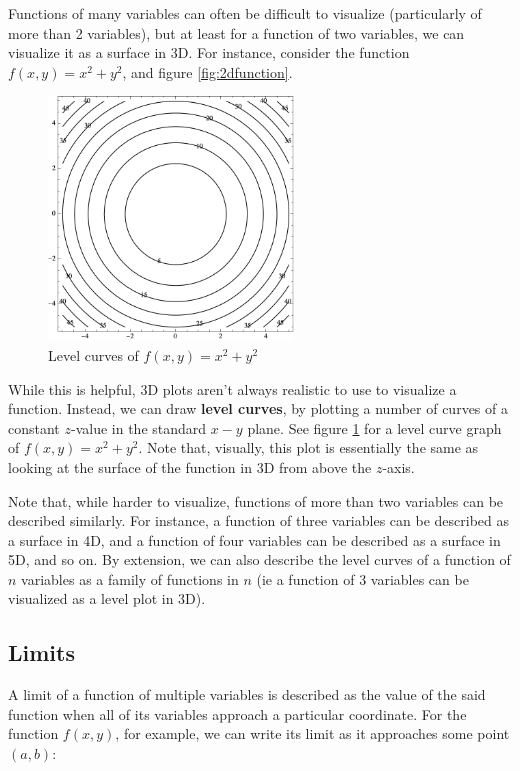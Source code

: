 \documentclass[12pt]{article}
\begin{document}
Functions of many variables can often be difficult to visualize (particularly of more than 2 variables), but at least for a function of two variables, we can visualize it as a surface in 3D. For instance, consider the function $f(x,y) = x^2 + y^2$, and figure \ref{fig:2dfunction}.

\begin{figure}
    \centering
    \includegraphics[width=6.5cm]{misc/levelcurves.png}
    \caption{Level curves of $f(x,y) = x^2 + y^2$}
    \label{fig:levelcurves}
\end{figure}

While this is helpful, 3D plots aren't always realistic to use to visualize a function. Instead, we can draw \textbf{level curves}, by plotting a number of curves of a constant $z$-value in the standard $x-y$ plane. See figure \ref{fig:levelcurves} for a level curve graph of $f(x,y) = x^2 + y^2$. Note that, visually, this plot is essentially the same as looking at the surface of the function in 3D from above the $z$-axis.

Note that, while harder to visualize, functions of more than two variables can be described similarly. For instance, a function of three variables can be described as a surface in 4D, and a function of four variables can be described as a surface in 5D, and so on. By extension, we can also describe the level curves of a function of $n$ variables as a family of functions in $n$ (ie a function of 3 variables can be visualized as a level plot in 3D).

\subsection{Limits}

A limit of a function of multiple variables is described as the value of the said function when all of its variables approach a particular coordinate. For the function $f(x,y)$, for example, we can write its limit as it approaches some point $(a,b)$:
\end{document}
